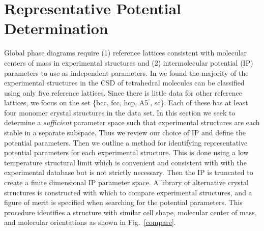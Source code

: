 \documentclass[preprint]{iucr}              %
\begin{document}

\section{Representative Potential Determination}
\label{method}

Global phase diagrams require (1) reference lattices consistent with
molecular centers of mass in experimental structures and (2)
intermolecular potential (IP) parameters to use as independent
parameters. In \cite{McClurg05} we found the majority of the
experimental structures in the CSD of tetrahedral molecules can be
classified using only five reference lattices. Since there is little
data for other reference lattices, we focus on the set \{bcc, fcc,
hcp, A5$^\prime$, sc\}. Each of these has at least four monomer
crystal structures in the data set. In this section we seek to
determine a \emph{sufficient} parameter space such that experimental
structures are each stable in a separate subspace. Thus we review
our choice of IP and define the potential parameters.  Then we
outline a method for identifying representative potential parameters
for each experimental structure. This is done using a low
temperature structural limit which is convenient and consistent with
with the experimental database but is not strictly necessary.  Then
the IP is truncated to create a finite dimensional IP parameter
space.  A library of alternative crystal structures is constructed
with which to compare experimental structures, and a figure of merit
is specified when searching for the potential parameters. This
procedure identifies a structure with similar cell shape, molecular
center of mass, and molecular orientations as shown in
Fig.~\ref{compare}.

\end{document}
